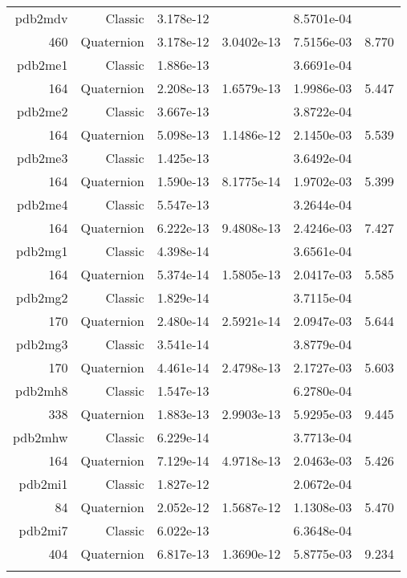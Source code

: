 \begin{xltabular}{\textwidth}{r|rS[table-format=1.3e+2]S[table-format=1.4e+2]S[table-format=1.4e+2]S[table-format=-1.3]}
pdb2mdv & Classic & 3.178e-12 &  & 8.5701e-04 & \\
460 & Quaternion & 3.178e-12 & 3.0402e-13 & 7.5156e-03 & 8.770\\  \addlinespace
pdb2me1 & Classic & 1.886e-13 &  & 3.6691e-04 & \\
164 & Quaternion & 2.208e-13 & 1.6579e-13 & 1.9986e-03 & 5.447\\  \addlinespace
pdb2me2 & Classic & 3.667e-13 &  & 3.8722e-04 & \\
164 & Quaternion & 5.098e-13 & 1.1486e-12 & 2.1450e-03 & 5.539\\  \addlinespace
pdb2me3 & Classic & 1.425e-13 &  & 3.6492e-04 & \\
164 & Quaternion & 1.590e-13 & 8.1775e-14 & 1.9702e-03 & 5.399\\  \addlinespace
pdb2me4 & Classic & 5.547e-13 &  & 3.2644e-04 & \\
164 & Quaternion & 6.222e-13 & 9.4808e-13 & 2.4246e-03 & 7.427\\  \addlinespace
pdb2mg1 & Classic & 4.398e-14 &  & 3.6561e-04 & \\
164 & Quaternion & 5.374e-14 & 1.5805e-13 & 2.0417e-03 & 5.585\\  \addlinespace
pdb2mg2 & Classic & 1.829e-14 &  & 3.7115e-04 & \\
170 & Quaternion & 2.480e-14 & 2.5921e-14 & 2.0947e-03 & 5.644\\  \addlinespace
pdb2mg3 & Classic & 3.541e-14 &  & 3.8779e-04 & \\
170 & Quaternion & 4.461e-14 & 2.4798e-13 & 2.1727e-03 & 5.603\\  \addlinespace
pdb2mh8 & Classic & 1.547e-13 &  & 6.2780e-04 & \\
338 & Quaternion & 1.883e-13 & 2.9903e-13 & 5.9295e-03 & 9.445\\  \addlinespace
pdb2mhw & Classic & 6.229e-14 &  & 3.7713e-04 & \\
164 & Quaternion & 7.129e-14 & 4.9718e-13 & 2.0463e-03 & 5.426\\  \addlinespace
pdb2mi1 & Classic & 1.827e-12 &  & 2.0672e-04 & \\
84 & Quaternion & 2.052e-12 & 1.5687e-12 & 1.1308e-03 & 5.470\\  \addlinespace
pdb2mi7 & Classic & 6.022e-13 &  & 6.3648e-04 & \\
404 & Quaternion & 6.817e-13 & 1.3690e-12 & 5.8775e-03 & 9.234\\  \addlinespace

\end{xltabular}
